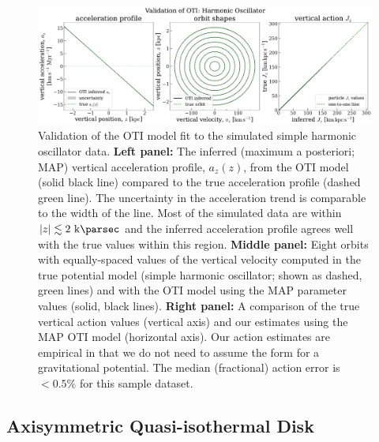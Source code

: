 \begin{figure}[t!]
\begin{center}
\includegraphics[width=\textwidth]{sho-validation.pdf}
\end{center}
\caption{%
Validation of the OTI model fit to the simulated simple harmonic oscillator data.
\textbf{Left panel:} The inferred (maximum a posteriori; MAP) vertical acceleration
profile, $a_z(z)$, from the OTI model (solid black line) compared to the true
acceleration profile (dashed green line).
The uncertainty in the acceleration trend is comparable to the width of the line.
Most of the simulated data are within $|z| \lesssim 2~\kpc$ and the inferred
acceleration profile agrees well with the true values within this region.
\textbf{Middle panel:} Eight orbits with equally-spaced values of the vertical velocity
computed in the true potential model (simple harmonic oscillator; shown as dashed, green
lines) and with the OTI model using the MAP parameter values (solid, black lines).
\textbf{Right panel:} A comparison of the true vertical action values (vertical axis)
and our estimates using the MAP OTI model (horizontal axis).
Our action estimates are empirical in that we do not need to assume the form for a
gravitational potential.
The median (fractional) action error is $<0.5\%$ for this sample dataset.
\label{fig:sho-validation}
}
\end{figure}

\subsection{Axisymmetric Quasi-isothermal Disk}
\label{sec:sim-qiso}

